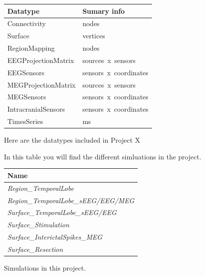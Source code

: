 \documentclass{tufte-handout}
\begin{document}
\begin{margintable}
  \centering
  \selectfont
  \begin{tabular}{ll}
    \toprule
    Datatype & Sumary info                       \\
    \midrule
    Connectivity         & \unit[X]{nodes}                    \\
    Surface              & \unit[15000 x 3]{vertices}     \\
    RegionMapping        & \unit[15000]{nodes}            \\
    EEGProjectionMatrix     & \unit[M x N]{sources x sensors} \\
    EEGSensors              & \unit[N x 4]{sensors x coordinates} \\
    MEGProjectionMatrix     & \unit[M x N]{sources x sensors} \\
    MEGSensors              & \unit[N x 4]{sensors x coordinates}\\
    IntracranialSensors     & \unit[N x 4]{sensors x coordinates} \\
    TimesSeries          & \unit[5000]{ms} \\
    \bottomrule
  \end{tabular}
  \caption{Here are the datatypes included in Project X}
  \label{tab:margintab}
\end{margintable}

In this table you will find the different simluations in the project.
\begin{margintable}
  \centering
  \selectfont
  \begin{tabular}{l}
    \toprule
    Name \\
    \midrule
    \textit{Region\_TemporalLobe} \\
    \textit{Region\_TemporalLobe\_sEEG/EEG/MEG}  \\ 
    \textit{Surface\_TemporalLobe\_sEEG/EEG}  \\ 
    \textit{Surface\_Stimulation}  \\ 
    \textit{Surface\_InterictalSpikes\_MEG} \\
    \textit{Surface\_Resection} \\
    \bottomrule
  \end{tabular}
  \caption{Simulations in this project.}
  \label{tab:simtab}
\end{margintable}

\end{document}
